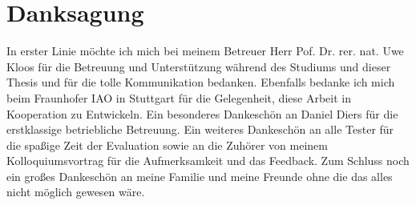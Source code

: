 \chapter*{Danksagung}

In erster Linie möchte ich mich bei meinem Betreuer Herr Pof. Dr. rer. nat. Uwe Kloos für die Betreuung und Unterstützung während des Studiums und dieser Thesis und für die tolle Kommunikation bedanken. Ebenfalls bedanke ich mich beim Fraunhofer IAO in Stuttgart für die Gelegenheit, diese Arbeit in Kooperation zu Entwickeln. Ein besonderes Dankeschön an Daniel Diers für die erstklassige betriebliche Betreuung. Ein weiteres Dankeschön an alle Tester für die spaßige Zeit der Evaluation sowie an die Zuhörer von meinem Kolloquiumsvortrag für die Aufmerksamkeit und das Feedback. Zum Schluss noch ein großes Dankeschön an meine Familie und meine Freunde ohne die das alles nicht möglich gewesen wäre.
